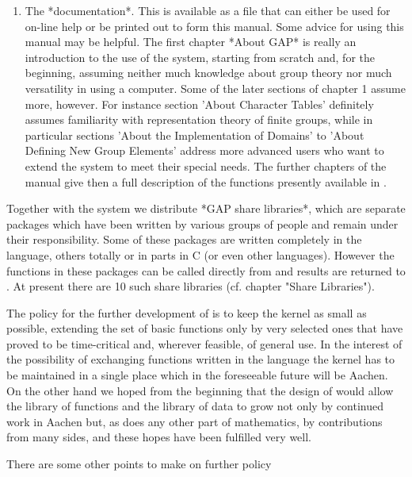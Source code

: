 \begin{enumerate}
\item

The *documentation*.  This is available as a file that can either be used
for on-line help or be printed out  to form this manual.  Some advice for
using  this manual  may be  helpful.  The  first chapter  *About GAP*  is
really an  introduction  to the use of the  system, starting from scratch
and, for  the  beginning,  assuming neither much  knowledge  about  group
theory  nor much versatility in  using  a computer.   Some  of the  later
sections of chapter 1 assume more,  however.  For instance section 'About
Character  Tables'  definitely  assumes  familiarity  with representation
theory  of  finite  groups,  while  in  particular  sections  'About  the
Implementation of Domains' to 'About Defining New Group Elements' address
more advanced users  who want to  extend the system to meet their special
needs.  The further chapters of  the manual give  then a full description
of the functions presently available in {\GAP}.

\end{enumerate}

Together with the  system we distribute *GAP  share libraries*, which are
separate packages which have been written by various groups of people and
remain   under their responsibility.  Some  of these packages are written
completely in the  {\GAP} language, others totally or  in parts in C  (or
even  other languages). However  the  functions in these  packages can be
called  directly from   {\GAP}  and results are   returned  to {\GAP}. At
present   there   are  10  such  share    libraries  (cf. chapter  "Share
Libraries").

The policy for the further development of {\GAP} is to keep the kernel as
small  as possible,  extending  the set  of basic functions  only by very
selected   ones that  have  proved  to   be  time-critical and,  wherever
feasible,  of  general use.    In  the interest  of the    possibility of
exchanging functions written in the {\GAP} language the  kernel has to be
maintained in  a  single place  which in  the foreseeable  future will be
Aachen.  On the other hand we hoped from the beginning that the design of
{\GAP} would  allow the library  of {\GAP} functions   and the library of
data to grow not only by continued work in Aachen  but, as does any other
part of mathematics, by contributions  from  many sides, and these  hopes
have been fulfilled very well.

There are some other points to make on further policy{\:}

